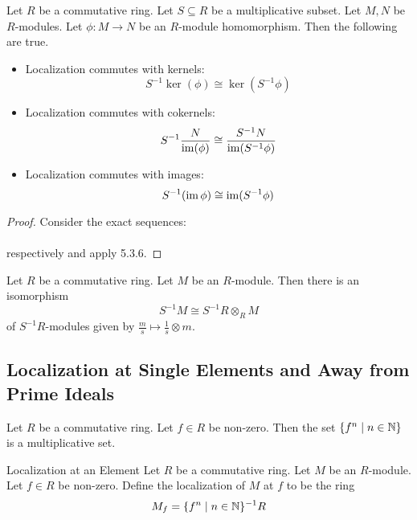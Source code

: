 \documentclass[a4paper]{article}
\begin{document}
\begin{lmm}{}{} Let $R$ be a commutative ring. Let $S\subseteq R$ be a multiplicative subset. Let $M,N$ be $R$-modules. Let $\phi:M\to N$ be an $R$-module homomorphism. Then the following are true. 
\begin{itemize}
\item Localization commutes with kernels: $$S^{-1}\ker(\phi)\cong\ker(S^{-1}\phi)$$
\item Localization commutes with cokernels: $$S^{-1}\frac{N}{\operatorname{im}(\phi)}\cong\frac{S^{-1}N}{\operatorname{im}(S^{-1}\phi)}$$
\item Localization commutes with images: $$S^{-1}(\operatorname{im}\phi)\cong\operatorname{im}(S^{-1}\phi)$$
\end{itemize} 
\begin{proof}
Consider the exact sequences: \\
\\
respectively and apply 5.3.6. 
\end{proof}
\end{lmm}

\begin{prp}{}{} Let $R$ be a commutative ring. Let $M$ be an $R$-module. Then there is an isomorphism $$S^{-1}M\cong S^{-1}R\otimes_RM$$ of $S^{-1}R$-modules given by $\frac{m}{s}\mapsto\frac{1}{s}\otimes m$. 
\end{prp}

\subsection{Localization at Single Elements and Away from Prime Ideals}
\begin{lmm}{}{} Let $R$ be a commutative ring. Let $f\in R$ be non-zero. Then the set $\{f^n\;|\;n\in\mathbb{N}\}$ is a multiplicative set. 
\end{lmm}

\begin{defn}{Localization at an Element}{} Let $R$ be a commutative ring. Let $M$ be an $R$-module. Let $f\in R$ be non-zero. Define the localization of $M$ at $f$ to be the ring $$M_f=\{f^n\;|\;n\in\mathbb{N}\}^{-1}R$$
\end{defn}
\end{document}
